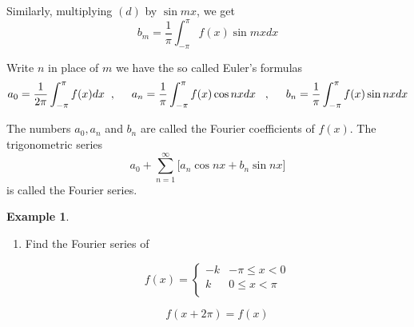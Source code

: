 \documentclass[11pt,a4paper]{article}
\theoremstyle{definition}
\newtheorem{exa}[thm]{Example}
\begin{document}
Similarly, multiplying $(d)$ by $\sin mx$, we get $$ b_m = \frac{1}{\pi}\int^{\pi}_{-\pi} f(x)\sin mx dx$$


Write $n$ in place of $m$ we have the so called Euler's formulas
$$a_0 = \frac{1}{2\pi}\int^{\pi}_{-\pi}f(x)dx\hspace{0.2cm}, \hspace{0.5cm} a_n = \frac{1}{\pi}\int^{\pi}_{-\pi} f(x) \cos nx dx\hspace{0.3cm}, \hspace{0.5cm} b_n = \frac{1}{\pi}\int^{\pi}_{-\pi} f(x)\sin nx dx$$

The numbers $a_0, a_n$ and $b_n$ are called the Fourier coefficients of $f(x)$. The trigonometric series 
$$a_0 + \sum^{\infty}_{n=1} \Big[a_n \cos nx + b_n \sin nx\Big]$$ is called the Fourier series.


\begin{exa}
\begin{enumerate}
\item Find the Fourier series  of 

\[f(x) = 
\begin{cases}
-k & -\pi \leq x <0\\
k & 0\leq x <\pi\\
\end{cases}
\]

$$f(x + 2\pi) = f(x)$$

\pagebreak
\end{enumerate}
\end{exa}
\end{document}
